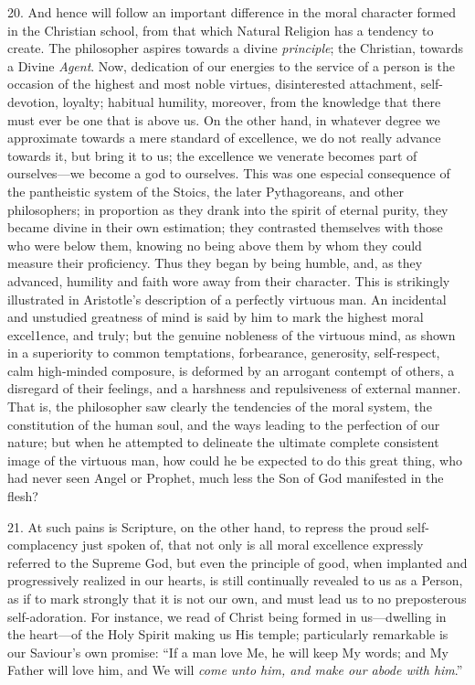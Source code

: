 20. And hence will follow an important difference in the moral
character formed in the Christian school, from that which Natural
Religion has a tendency to create. The philosopher aspires towards a
divine \emph{principle}; the Christian, towards a Divine \emph{Agent}.
Now, dedication of our energies to the service of a person is the
occasion of the highest and most noble virtues, disinterested
attachment, self-devotion, loyalty; habitual humility, moreover, from
the knowledge that there must ever be one that is above us. On the
other hand, in whatever degree we approximate towards a mere standard
of excellence, we do not really advance towards it, but bring it to
us; the excellence we venerate becomes part of ourselves—we become a
god to ourselves. This was one especial consequence of the pantheistic
system of the Stoics, the later Pythagoreans, and other philosophers;
in proportion as they drank into the spirit of eternal purity, they
became divine in their own estimation; they contrasted themselves with
those who were below them, knowing no being above them by whom they
could measure their proficiency. Thus they began by being humble, and,
as they advanced, humility and faith wore away from their character.
This is strikingly illustrated in Aristotle's description of a
perfectly virtuous man. An incidental and unstudied greatness of mind
is said by him to mark the highest moral excel1ence, and truly; but
the genuine nobleness of the virtuous mind, as shown in a superiority
to common temptations, forbearance, generosity, self-respect, calm
high-minded composure, is deformed by an arrogant contempt of others,
a disregard of their feelings, and a harshness and repulsiveness of
external manner. That is, the philosopher saw clearly the tendencies
of the moral system, the constitution of the human soul, and the ways
leading to the perfection of our nature; but when he attempted to
delineate the ultimate complete consistent image of the virtuous man,
how could he be expected to do this great thing, who had never seen
Angel or Prophet, much less the Son of God manifested in the flesh?

21. At such pains is Scripture, on the other hand, to repress the
proud self-complacency just spoken of, that not only is all moral
excellence expressly referred to the Supreme God, but even the
principle of good, when implanted and progressively realized in our
hearts, is still continually revealed to us as a Person, as if to mark
strongly that it is not our own, and must lead us to no preposterous
self-adoration. For instance, we read of Christ being formed in us—dwelling
in the heart—of the Holy Spirit making us His temple; particularly
remarkable is our Saviour's own promise: ``If a man love Me, he
will keep My words; and My Father will love him, and We will \emph{come
unto him, and make our abode with him}.''

